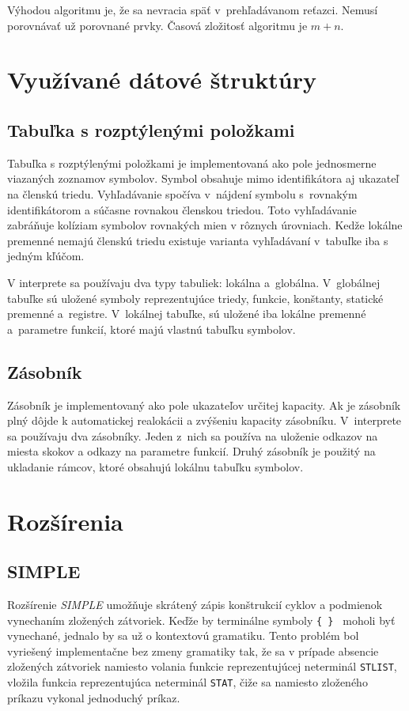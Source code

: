 \documentclass[11pt,a4paper]{article}
\begin{document}
	Výhodou algoritmu je, že sa nevracia späť v~prehľadávanom reťazci. Nemusí porovnávať už porovnané prvky. Časová zložitosť algoritmu je ${m+n}$.

	\section{Využívané dátové štruktúry}
	\label{struktury}

	\subsection{Tabuľka s rozptýlenými položkami}
	Tabuľka s rozptýlenými položkami je implementovaná ako pole jednosmerne
	viazaných zoznamov symbolov. Symbol obsahuje
	mimo identifikátora aj ukazateľ na členskú triedu. Vyhľadávanie spočíva
	v~nájdení symbolu s~rovnakým identifikátorom
	a súčasne rovnakou členskou triedou. Toto vyhľadávanie zabráňuje kolíziam
	symbolov rovnakých mien v rôznych úrovniach.
	Kedže lokálne premenné nemajú členskú triedu existuje varianta vyhľadávaní v~tabuľke
	iba s jedným kľúčom.

	V interprete sa používaju dva typy tabuliek: lokálna a~globálna. V~globálnej
	tabuľke sú uložené symboly reprezentujúce triedy, funkcie, konštanty, statické
	premenné a~registre. V~lokálnej tabuľke, sú uložené iba lokálne premenné a~parametre
	funkcií, ktoré majú vlastnú tabuľku symbolov.

	\subsection{Zásobník}
	Zásobník je implementovaný ako pole ukazateľov určitej kapacity. Ak je zásobník
	plný dôjde k automatickej realokácii a zvýšeniu kapacity zásobníku.
	V~interprete sa používaju dva zásobníky. Jeden z~nich sa používa na uloženie
	odkazov na miesta skokov a odkazy na parametre funkcií. Druhý zásobník je
	použitý na ukladanie rámcov, ktoré obsahujú lokálnu tabuľku symbolov.

	\section{Rozšírenia}
	\label{rozsirenia}

	\subsection{SIMPLE}
	Rozšírenie \emph{SIMPLE} umožňuje skrátený zápis konštrukcií cyklov a
	podmienok vynechaním zložených zátvoriek. Keďže by terminálne symboly
	\texttt{\{ \} } moholi byť vynechané, jednalo by sa už o kontextovú gramatiku.
	Tento problém bol vyriešený implementačne bez zmeny
	gramatiky tak, že sa v prípade absencie zložených zátvoriek namiesto volania
	funkcie reprezentujúcej neterminál \texttt{STLIST}, vložila
	funkcia reprezentujúca neterminál \texttt{STAT}, čiže sa namiesto zloženého
	príkazu vykonal jednoduchý príkaz.
\end{document}
